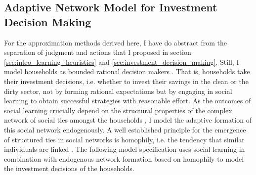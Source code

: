 \subsection{Adaptive Network Model for Investment Decision Making}
\label{sec:investment_decision_making_descr.}
For the approximation methods derived here, I have do abstract from the separation of judgment and actions that I proposed in section \ref{sec:intro_learning_heuristics} and \ref{sec:investment_decision_making}.
Still, I model households as bounded rational decision makers \citep{simon1972theories, simon1982models, gigerenzer2002bounded}.
That is, households take their investment decisions, i.e. whether to invest their savings in the clean or the dirty sector, not by forming rational expectations \citep{Evans2006, Kirman2014} but by engaging in social learning \citep{Bandura1971} to obtain successful strategies \citep{Traulsen2010} with reasonable effort.
As the outcomes of social learning crucially depend on the structural properties of the complex network of social ties amongst the households \citep{Barkoczi2016}, I model the adaptive formation of this social network endogenously.
A well established principle for the emergence of structured ties in social networks is homophily, i.e. the tendency that similar individuals are linked \citep{McPherson2007, Centola2007, Centola2011}.
The following model specification uses social learning in combination with endogenous network formation based on homophily to model the investment decisions of the households.

